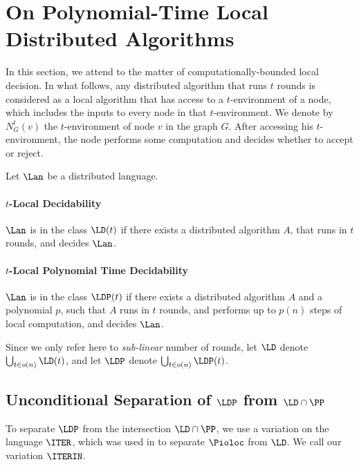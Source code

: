 \section{On Polynomial-Time Local Distributed Algorithms}
\label{sec:local}
In this section, we attend to the matter of computationally-bounded local decision.
In what follows, any distributed algorithm that runs $t$ rounds is considered as a local algorithm that has access to a $t$-environment of a node, which includes the inputs to every node in that $t$-environment. We denote by $N^t_G(v)$ the $t$-environment of node $v$ in the graph $G$. After accessing his $t$-environment, the node performs some computation and decides whether to accept or reject.
\begin{definition}[$\LD$, $\LDP$]
    Let $\Lan$ be a distributed language.
    \paragraph{$t$-Local Decidability} $\Lan$ is in the class $\LD(t)$ if there exists a distributed algorithm $A$, that runs in $t$ rounds, and decides $\Lan$.
    \paragraph{$t$-Local Polynomial Time Decidability} $\Lan$ is in the class $\LDP(t)$ if there exists a distributed algorithm $A$ and a polynomial $p$, such that $A$ runs in $t$ rounds, and performs up to $p(n)$ steps of local computation, and decides $\Lan$.
\end{definition}

Since we only refer here to \emph{sub-linear} number of rounds, let $\LD$ denote $\bigcup_{t\in o(n)}\LD(t)$, and let $\LDP$ denote $\bigcup_{t\in o(n)}\LDP(t)$.

\subsection{Unconditional Separation of $\LDP$ from $\LD \cap \PP$}
To separate $\LDP$ from the intersection $\LD \cap \PP$,
we use a variation on the language $\ITER$, which was used in \cite{balliu2018can} to separate $\Pioloc$ from $\LD$.
We call our variation $\ITERIN$.

